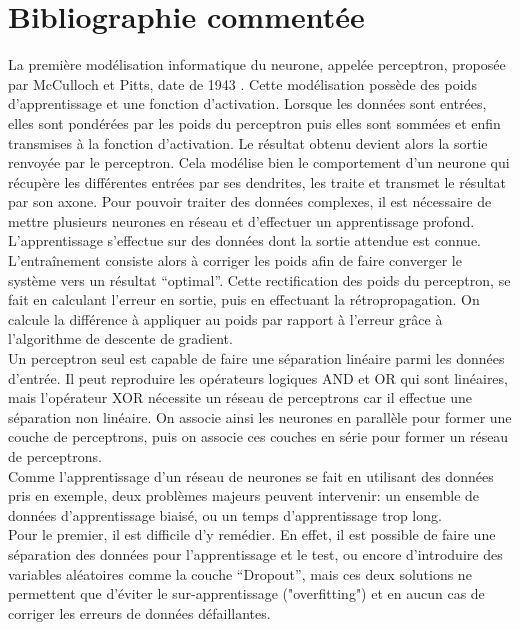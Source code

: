\documentclass[12pt,a4paper, french]{article}
\begin{document}
\section*{Bibliographie commentée}
La première modélisation informatique du neurone, appelée perceptron, proposée par McCulloch et Pitts, date de 1943 \cite{McCulloch}. Cette modélisation possède des poids d'apprentissage et une fonction d’activation. Lorsque les données sont entrées, elles sont pondérées par les poids du perceptron puis elles sont sommées et enfin transmises à la fonction d’activation. Le résultat obtenu devient alors la sortie renvoyée par le perceptron. Cela modélise bien le comportement d’un neurone qui récupère les différentes entrées par ses dendrites, les traite et transmet le résultat par son axone. Pour pouvoir traiter des données complexes, il est nécessaire de mettre plusieurs neurones en réseau et d'effectuer un apprentissage profond. \medskip
\\
L’apprentissage s'effectue sur des données dont la sortie attendue est connue. L’entraînement consiste alors à corriger les poids afin de faire converger le système vers un résultat “optimal”. Cette rectification des poids du perceptron, se fait en calculant l’erreur en sortie, puis en effectuant la rétropropagation. On calcule la différence à appliquer au poids par rapport à l'erreur grâce à l’algorithme de descente de gradient. \cite{3Blue1Brown} \medskip
\\
Un perceptron seul est capable de faire une séparation linéaire parmi les données d’entrée. Il peut reproduire les opérateurs logiques AND et OR qui sont linéaires, mais l'opérateur XOR nécessite un réseau de perceptrons car il effectue une séparation non linéaire. On associe ainsi les neurones en parallèle pour former une couche de perceptrons, puis on associe ces couches en série pour former un réseau de perceptrons. \cite{ann} \medskip
\\
Comme l’apprentissage d’un réseau de neurones se fait en utilisant des données pris en exemple, deux problèmes majeurs peuvent intervenir: un ensemble de données d’apprentissage biaisé, ou un temps d’apprentissage trop long. \\
Pour le premier, il est difficile d’y remédier. En effet, il est possible de faire une séparation des données pour l’apprentissage et le test, ou encore d’introduire des variables aléatoires comme la couche “Dropout”, mais ces deux solutions ne permettent que d’éviter le sur-apprentissage ("overfitting") et en aucun cas de corriger les erreurs de données défaillantes. \\
\end{document}
